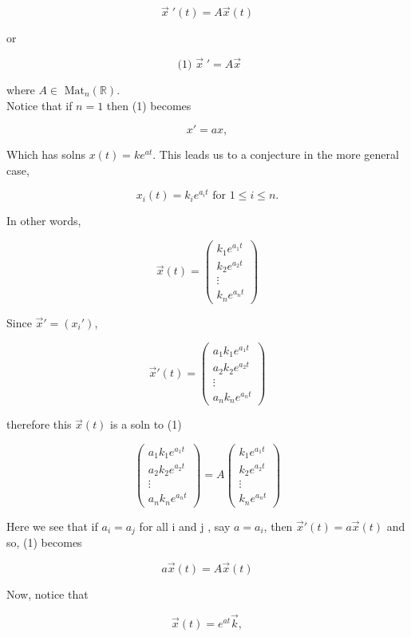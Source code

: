 \documentclass[12pt,a4paper]{article}
\theoremstyle{definition}
\begin{document}
\[ \vec{x} \;'(t) = A \vec{x}(t) \]

or

\[ \text{ (1) } \vec{x} \;' = A \vec{x} \]

where \( A \in \text{ Mat}_n ( \mathbb{R})  \). \\

Notice that if \( n = 1 \) then (1) becomes 

\[ x' = ax, \]

Which has solns  \( x(t) = ke^{at}. \) This leads us to a conjecture in
the more general case, 

\[ x_i(t) = k_ie^{a_it} \text{ for } 1 \leq i \leq n.\]

In other words, 

\[ \vec{x}(t) =
\begin{pmatrix}
  k_1e^{a_1t} \\
  k_2e^{a_2t} \\
  \vdots \\
  k_ne^{a_nt} 
\end{pmatrix}\]

Since \( \vec{x}' = (x_i') \), 

\[ \vec{x}'(t) =
\begin{pmatrix}
  a_1k_1e^{a_1t} \\
  a_2k_2e^{a_2t} \\
  \vdots \\
  a_nk_ne^{a_nt} 
\end{pmatrix}\]

therefore this \( \vec{x}(t) \) is a soln to (1) \iff

\[ 
\begin{pmatrix}
  a_1k_1e^{a_1t} \\
  a_2k_2e^{a_2t} \\
  \vdots \\
  a_nk_ne^{a_nt} 
\end{pmatrix}
=A
\begin{pmatrix}
  k_1e^{a_1t} \\
  k_2e^{a_2t} \\
  \vdots \\
  k_ne^{a_nt} 
\end{pmatrix}
\]

Here we see that if \( a_i = a_j \) for all i and j , say \( a = a_i\), then
\( \vec{x}'(t) = a\vec{x}(t) \) and so, (1) becomes 

\[ a\vec{x}(t) = A\vec{x}(t) \]

Now, notice that 

\[ \vec{x}(t) = e^{at}\vec{k}, \]
\end{document}
